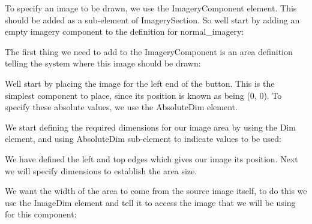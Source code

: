 To specify an image to be drawn, we use the Imagery\+Component element. This should be added as a sub-\/element of Imagery\+Section. So we\textquotesingle{}ll start by adding an empty imagery component to the definition for \textquotesingle{}normal\+\_\+imagery\textquotesingle{}\+: 
\begin{DoxyCode}{0}
\DoxyCodeLine{}
\DoxyCodeLine{}
\end{DoxyCode}


The first thing we need to add to the Imagery\+Component is an area definition telling the system where this image should be drawn\+: 
\begin{DoxyCode}{0}
\DoxyCodeLine{}
\DoxyCodeLine{}
\end{DoxyCode}


We\textquotesingle{}ll start by placing the image for the left end of the button. This is the simplest component to place, since its position is known as being (0, 0). To specify these absolute values, we use the Absolute\+Dim element.

We start defining the required dimensions for our image area by using the Dim element, and using Absolute\+Dim sub-\/element to indicate values to be used\+: 
\begin{DoxyCode}{0}
\DoxyCodeLine{}
\DoxyCodeLine{}
\DoxyCodeLine{}
\end{DoxyCode}


We have defined the left and top edges which gives our image its position. Next we will specify dimensions to establish the area size.

We want the width of the area to come from the source image itself, to do this we use the Image\+Dim element and tell it to access the image that we will be using for this component\+: 
\begin{DoxyCode}{0}
\DoxyCodeLine{}
\DoxyCodeLine{  />}
\DoxyCodeLine{}
\end{DoxyCode}


